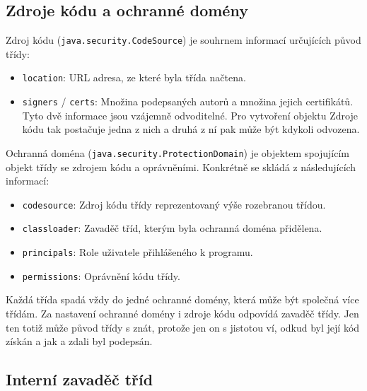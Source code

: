 \subsection{Zdroje kódu a ochranné domény}

Zdroj kódu ({\tt java.security.CodeSource}) je souhrnem informací určujících původ třídy: \cite{sourceCodeSource}

\begin{itemize}
  \item {\tt location}: URL adresa, ze které byla třída načtena.
  \item {\tt signers} / {\tt certs}: Množina podepsaných autorů a množina jejich certifikátů. Tyto dvě informace jsou vzájemně odvoditelné. Pro vytvoření objektu Zdroje kódu tak postačuje jedna z nich a druhá z ní pak může být kdykoli odvozena.
\end{itemize}

Ochranná doména ({\tt java.security.ProtectionDomain}) je objektem spojujícím objekt třídy se zdrojem kódu a oprávněními. Konkrétně se skládá z následujících informací: \cite{sourceProtectionDomain}

\begin{itemize}
  \item {\tt codesource}: Zdroj kódu třídy reprezentovaný výše rozebranou třídou.
  \item {\tt classloader}: Zavaděč tříd, kterým byla ochranná doména přidělena.
  \item {\tt principals}: Role uživatele přihlášeného k programu.
  \item {\tt permissions}: Oprávnění kódu třídy.
\end{itemize}

Každá třída spadá vždy do jedné ochranné domény, která může být společná více třídám. Za nastavení ochranné domény i zdroje kódu odpovídá zavaděč třídy. Jen ten totiž může původ třídy s znát, protože jen on s jistotou ví, odkud byl její kód získán a jak a zdali byl podepsán.

\subsection{Interní zavaděč tříd} \label{interniZavadec}

